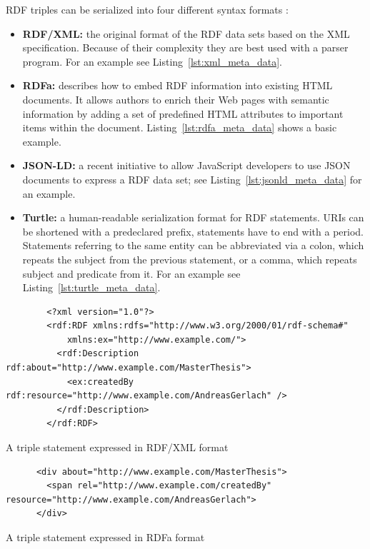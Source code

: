 \gls{RDF} triples can be serialized into four different syntax formats \citep[pg. 43-54]{wood2014linked}: \@

\begin{itemize}

	\item \textbf{\gls{RDF}/\gls{XML}:} the original format of the \gls{RDF} data sets based on the \gls{XML} specification. Because of their complexity they are best used with a parser program. For an example see Listing~\ref{lst:xml_meta_data}.
	\item \textbf{\gls{RDFa}:} describes how to embed \gls{RDF} information into existing \gls{HTML} documents. It allows authors to enrich their Web pages with semantic information by adding a set of predefined \gls{HTML} attributes to important items within the document. Listing~\ref{lst:rdfa_meta_data} shows a basic example.
	\item \textbf{\gls{JSON-LD}:} a recent initiative to allow JavaScript developers to use \gls{JSON} documents to express a \gls{RDF} data set; see Listing~\ref{lst:jsonld_meta_data} for an example.
	\item \textbf{Turtle:} a human-readable serialization format for \gls{RDF} statements. \gls{URI}s can be shortened with a predeclared prefix, statements have to end with a period. Statements referring to the same entity can be abbreviated via a colon, which repeats the subject from the previous statement, or a comma, which repeats subject and predicate from it. For an example see Listing~\ref{lst:turtle_meta_data}.
\end{itemize}

\begin{listing}[H]
	\begin{verbatim}
		<?xml version="1.0"?>
		<rdf:RDF xmlns:rdfs="http://www.w3.org/2000/01/rdf-schema#"
			xmlns:ex="http://www.example.com/">
		  <rdf:Description rdf:about="http://www.example.com/MasterThesis">
		    <ex:createdBy rdf:resource="http://www.example.com/AndreasGerlach" />
		  </rdf:Description>
		</rdf:RDF>
	\end{verbatim}
\caption{A triple statement expressed in \gls{RDF}/\gls{XML} format}
\label{lst:xml_meta_data}
\end{listing}

\begin{listing}[H]
	\begin{verbatim}
	  <div about="http://www.example.com/MasterThesis">
	    <span rel="http://www.example.com/createdBy" resource="http://www.example.com/AndreasGerlach">
	  </div>
	\end{verbatim}
\caption{A triple statement expressed in \gls{RDFa} format}
\label{lst:rdfa_meta_data}
\end{listing}

